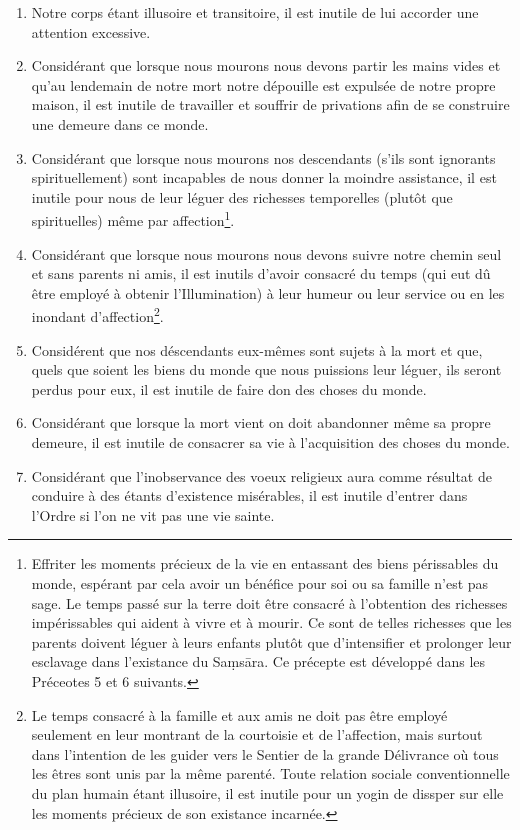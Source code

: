 \documentclass[10pt]{book}
\begin{document}
\begin{enumerate}[1.-]
\item Notre corps étant illusoire et transitoire, il est inutile de lui accorder une attention excessive.
\item Considérant que lorsque nous mourons nous devons partir les mains vides et qu'au lendemain de notre mort notre dépouille est expulsée de notre propre maison, il est inutile de travailler et souffrir de privations afin de se construire une demeure dans ce monde.
\item Considérant que lorsque nous mourons nos descendants (s'ils sont ignorants spirituellement) sont incapables de nous donner la moindre assistance, il est inutile pour nous de leur léguer des richesses temporelles (plutôt que spirituelles) même par affection\footnote{Effriter les moments précieux de la vie en entassant des biens périssables du monde, espérant par cela avoir un bénéfice pour soi ou sa famille n'est pas sage. Le temps passé sur la terre doit être consacré à l'obtention des richesses impérissables qui aident à vivre et à mourir. Ce sont de telles richesses que les parents doivent léguer à leurs enfants plutôt que d'intensifier et prolonger leur esclavage dans l'existance du Saṃsāra. Ce précepte est développé dans les Préceotes 5 et 6 suivants.}.
\item Considérant que lorsque nous mourons nous devons suivre notre chemin seul et sans parents ni amis, il est inutils d'avoir consacré du temps (qui eut dû être employé à obtenir l'Illumination) à leur humeur ou leur service ou en les inondant d'affection\footnote{Le temps consacré à la famille et aux amis ne doit pas être employé seulement en leur montrant de la courtoisie et de l'affection, mais surtout dans l'intention de les guider vers le Sentier de la grande Délivrance où tous les êtres sont unis par la même parenté. Toute relation sociale conventionnelle du plan humain étant illusoire, il est inutile pour un yogin de dissper sur elle les moments précieux de son existance incarnée.}.
\item Considérent que nos déscendants eux-mêmes sont sujets à la mort et que, quels que soient les biens du monde que nous puissions leur léguer, ils seront perdus pour eux, il est inutile de faire don des choses du monde.
\item Considérant que lorsque la mort vient on doit abandonner même sa propre demeure, il est inutile de consacrer sa vie à l'acquisition des choses du monde.
\item Considérant que l'inobservance des voeux religieux aura comme résultat de conduire à des étants d'existence misérables, il est inutile d'entrer dans l'Ordre si l'on ne vit pas une vie sainte.

\end{enumerate}
\end{document}
